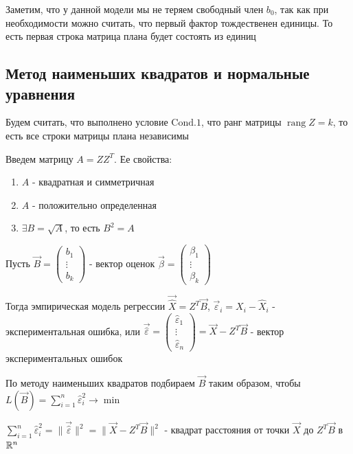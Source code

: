 \documentclass[12pt]{article}
\begin{document}
\Nota Заметим, что у данной модели мы не теряем свободный член $b_0$, так как при необходимости можно считать, что первый фактор тождественен единицы. 
То есть первая строка матрица плана будет состоять из единиц

\subsection{Метод наименьших квадратов и нормальные уравнения}

Будем считать, что выполнено условие $\mathrm{Cond. 1}$, что ранг матрицы $\operatorname{rang} Z = k$, то есть все строки матрицы плана независимы

Введем матрицу $A = Z Z^T$. Ее свойства:

\begin{enumerate}
    \item $A$ - квадратная и симметричная
    \item $A$ - положительно определенная
    \item $\exists B = \sqrt{A}$, то есть $B^2 = A$
\end{enumerate}

Пусть $\vec B = \begin{pmatrix}b_1 \\ \vdots \\ b_k\end{pmatrix}$ - вектор оценок $\vec \beta = \begin{pmatrix}\beta_1 \\ \vdots \\ \beta_k\end{pmatrix}$

Тогда эмпирическая модель регрессии $\vec{\hat X} = Z^T \vec B$, 
$\vec \varepsilon_i = X_i - \hat X_i$ - экспериментальная ошибка, или $\vec {\hat \varepsilon} = \begin{pmatrix}\hat \varepsilon_1 \\ \vdots \\ \hat \varepsilon_n\end{pmatrix} = \vec X - Z^T \vec B$ - вектор экспериментальных ошибок

По методу наименьших квадратов подбираем $\vec B$ таким образом, чтобы $L(\vec B) = \sum_{i = 1}^n \hat \varepsilon_i^2 \longrightarrow \min$

$\sum_{i = 1}^n \hat \varepsilon_i^2 = \|\vec{\hat \varepsilon}\|^2 = \| \vec X - Z^T \vec B\|^2$ - квадрат расстояния от точки $\vec X$ до $Z^T \vec B$ в $\mathbb{R}^n$
\end{document}
